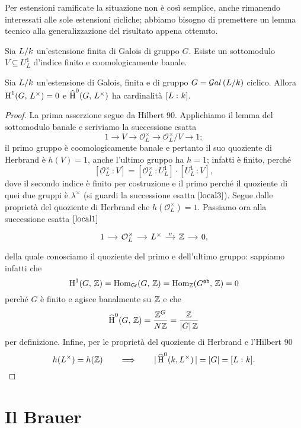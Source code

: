 Per estensioni ramificate la situazione non è così semplice, anche rimanendo interessati alle sole estensioni cicliche; abbiamo bisogno di premettere un lemma tecnico alla generalizzazione del risultato appena ottenuto.

\begin{lemma}
	Sia $ L/k $ un'estensione finita di Galois di gruppo $ G $. Esiste un sottomodulo $ V \subseteq U_L^1 $ d'indice finito e coomologicamente banale.
\end{lemma}

\begin{theorem} 
	Sia $ L/k $ un'estensione di Galois, finita e di gruppo $ G = \mathcal{G}al\left( L/k \right) $ ciclico. Allora $ \operatorname{H}^1(G, \, L^\times) = 0 $ e $ \operatorname{\widehat{H}}^0(G, \, L^\times) $ ha cardinalità $ [L \, \colon k] $.
\end{theorem}
\begin{proof}
	La prima asserzione segue da Hilbert 90. Applichiamo il lemma del sottomodulo banale e scriviamo la successione esatta 
	\[ 1 \to V \to \mathcal{O}_L^\times \to \mathcal{O}_L^\times/V \to 1; \]
	il primo gruppo è coomologicamente banale e pertanto il suo quoziente di Herbrand è $ h(V) = 1 $, anche l'ultimo gruppo ha $ h = 1 $; infatti è finito, perché $$  [\mathcal{O}_L^\times \, \colon V] = [\mathcal{O}_L^\times \,\colon U_L^1]\cdot[U_L^1 \,\colon V],  $$
	dove il secondo indice è finito per costruzione e il primo perché il quoziente di quei due gruppi è $ \lambda^\times $ (si guardi la successione esatta $ \ref{local3} $). Segue dalle proprietà del quoziente di Herbrand che $ h(\mathcal{O}_L^\times) = 1 $. Passiamo ora alla successione esatta $ \ref{local1} $
	\[ \begin{tikzcd}[column sep = small]
	1 \rar
	& \mathcal{O}_{L}^\times \rar
	& L^\times \rar["v"]
	& \Z \rar
	& 0,
	\end{tikzcd} \]
	della quale conosciamo il quoziente del primo e dell'ultimo gruppo: sappiamo infatti che $$  \operatorname{H}^1(G, \, \mathbb{Z}) = \operatorname{Hom}_\mathsf{Gr}(G, \, \mathbb{Z}) = \operatorname{Hom}_{\mathbb{Z}}(G^\texttt{ab}, \, \mathbb{Z}) = 0  $$ perché $ G $ è finito e agisce banalmente su $ \mathbb{Z} $ e che $$  \operatorname{\widehat{H}}^0(G, \, \mathbb{Z}) = \frac{\mathbb{Z}^G}{ N\mathbb{Z}} = \frac{\mathbb{Z}}{ |G|\, \mathbb{Z}}  $$ per definizione. Infine, per le proprietà del quoziente di Herbrand e l'Hilbert 90
	\[ h(L^\times) = h(\mathbb{Z}) \qquad\Longrightarrow\qquad |\operatorname{\widehat{H}}^0(k, L^\times)\, | = |G| = [L \, \colon k]. \]
\end{proof}


\section{Il Brauer}


